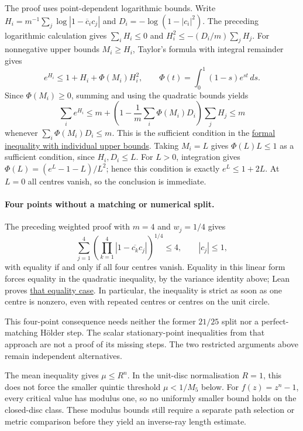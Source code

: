 \documentclass[11pt]{article}
\begin{document}
The proof uses point-dependent logarithmic bounds. Write
$H_i=m^{-1}\sum_j\log|1-\overline c_i c_j|$ and
$D_i=-\log(1-|c_i|^2)$. The preceding logarithmic calculation gives
$\sum_iH_i\le0$ and $H_i^2\le-(D_i/m)\sum_jH_j$.
For nonnegative upper bounds $M_i\ge H_i$, Taylor's formula with
integral remainder gives
\[
 e^{H_i}\le1+H_i+\Phi(M_i)H_i^2,
 \qquad \Phi(t)=\int_0^1(1-s)e^{st}\,ds.
\]
Since $\Phi(M_i)\ge0$, summing and using the quadratic bounds yields
\[
 \sum_i e^{H_i}
 \le m+\left(1-\frac1m\sum_i\Phi(M_i)D_i\right)\sum_jH_j
 \le m
\]
whenever $\sum_i\Phi(M_i)D_i\le m$. This is the sufficient condition
in the
\href{https://github.com/wcook04/plectis-erdos/blob/0d34630e1cc9d2b1ac6edfa7cfdba83b31bdc8fe/ErdosProblems/Erdos1041/LogKernelCentralCertificate.lean#L99}{formal inequality with individual upper bounds}.
Taking $M_i=L$ gives $\Phi(L)L\le1$ as a sufficient condition,
since $H_i,D_i\le L$. For $L>0$, integration gives
$\Phi(L)=(e^L-1-L)/L^2$; hence this condition is exactly
$e^L\le1+2L$. At $L=0$ all centres vanish, so the conclusion is
immediate.

\paragraph{Four points without a matching or numerical split.}
The preceding weighted proof with $m=4$ and $w_j=1/4$ gives
\[
 \sum_{j=1}^4\left(\prod_{k=1}^4|1-\overline{c_k}c_j|\right)^{1/4}\le4,
 \qquad |c_j|\le1,
\]
with equality if and only if all four centres vanish. Equality in this
linear form forces equality in the quadratic inequality, by the variance
identity above; Lean proves
\href{https://github.com/wcook04/plectis-erdos/blob/e6c2d8f77ac24753c5216a49f4daf7f7388b309f/lean/ErdosProblems/Erdos1041/PaperWeightedRefinementsR10.lean\#L17-L21}{that equality case}.
In particular, the
inequality is strict as soon as one centre is nonzero, even with repeated
centres or centres on the unit circle.

This four-point consequence needs neither the former $21/25$ split
nor a perfect-matching H\"older step. The scalar stationary-point
inequalities from that approach are not a proof of its missing steps.
The two restricted arguments above remain independent alternatives.

The mean inequality gives $\mu\le R^n$. In the unit-disc normalisation
$R=1$, this does not force the smaller quintic threshold $\mu<1/M_5$
below. For $f(z)=z^n-1$, every critical value has modulus one, so no
uniformly smaller bound holds on the closed-disc class. These modulus bounds still require a separate path selection or
metric comparison before they yield an inverse-ray length estimate.
\end{document}
